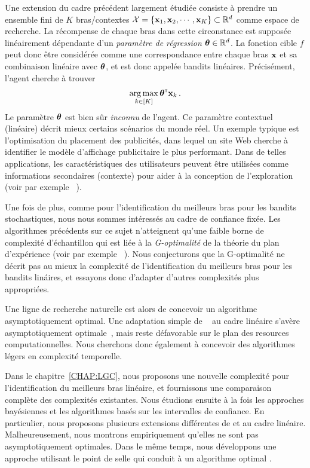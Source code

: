 Une extension du cadre pr\'ec\'edent largement étudiée consiste à prendre un ensemble fini de $K$ bras/contextes $\mathcal{X}=\{{\bf x}_1,{\bf x}_2,\cdots,{\bf x}_K\}\subset\mathbb{R}^d$ comme espace de recherche. La récompense de chaque bras dans cette circonstance est supposée linéairement d\'ependante d'un \emph{paramètre de régression} ${\boldsymbol \theta}\in\mathbb{R}^d$. La fonction cible $f$ peut donc être considérée comme une correspondance entre chaque bras ${\bf x}$ et sa combinaison linéaire avec ${\boldsymbol \theta}$, et est donc appelée bandits linéaires. Précisément, l'agent cherche à trouver
\begin{align}\label{eq:abs.optim_linbai}
    \operatorname*{arg\,max}_{k\in[K]} {\boldsymbol \theta}^{\mathsf{\scriptscriptstyle T}}{\bf x}_k\,.
\end{align}
Le paramètre ${\boldsymbol \theta}$ est bien sûr \emph{inconnu} de l'agent. Ce paramètre contextuel (linéaire) décrit mieux certains scénarios du monde réel. Un exemple typique est l'optimisation du placement des publicités, dans lequel un site Web cherche à identifier le modèle d'affichage publicitaire le plus performant. Dans de telles applications, les caractéristiques des utilisateurs peuvent être utilisées comme informations secondaires (contexte) pour aider à la conception de l'exploration (voir par exemple ~\citealt{li2010contextual}).

Une fois de plus, comme pour l'identification du meilleurs bras pour les bandits stochastiques, nous nous sommes intéressés au cadre de confiance fixée. Les algorithmes précédents sur ce sujet n'atteignent qu'une faible borne de complexité d'échantillon qui est liée à la \emph{G-optimalité} de la théorie du plan d'expérience (voir par exemple ~\citealt{pukelsheim2006optimal}). Nous conjecturons que la G-optimalité ne décrit pas au mieux la complexité de l'identification du meilleurs bras pour les bandits lin\'aires, et essayons donc d'adapter d'autres complexités plus appropriées.

Une ligne de recherche naturelle est alors de concevoir un algorithme asymptotiquement optimal. Une adaptation simple de \Track~\citep{garivier2016tracknstop} au cadre linéaire s'avère asymptotiquement optimale~\citep{jedra2020linear}, mais reste défavorable sur le plan des resources computationnelles. Nous cherchons donc également à concevoir des algorithmes l\'egers en complexit\'e temporelle. 

Dans le chapitre~\ref{CHAP:LGC}, nous proposons une nouvelle complexité pour l'identification du meilleurs bras linéaire, et fournissons une comparaison complète des complexités existantes. Nous étudions ensuite \`a la fois les approches bayésiennes et les algorithmes basés sur les intervalles de confiance. En particulier, nous proposons plusieurs extensions différentes de \TTTS{} et \TCC{} au cadre linéaire. Malheureusement, nous montrons empiriquement qu'elles ne sont pas asymptotiquement optimales. Dans le même temps, nous développons une approche utilisant le point de selle qui conduit à un algorithme optimal \LG{}.

